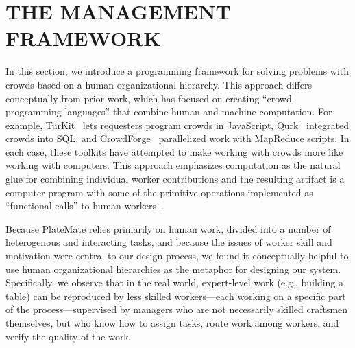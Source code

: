 \section{THE MANAGEMENT FRAMEWORK}
In this section, we introduce a programming framework for solving
problems with crowds based on a human organizational hierarchy. This
approach differs conceptually from prior work, which has focused on
creating ``crowd programming languages'' that combine human and
machine computation. For example, TurKit~\cite{little2010turkit} lets requesters
program crowds in JavaScript, Qurk~\cite{qurk} integrated crowds into
SQL, and CrowdForge~\cite{crowdforge} parallelized work with MapReduce
scripts. In each case, these toolkits have attempted to make working
with crowds more like working with computers.
This approach emphasizes computation as the natural glue for combining individual worker contributions and the resulting artifact is a computer program with some of the primitive operations implemented as ``functional calls'' to human workers~\cite{little2010turkit}.

Because PlateMate relies primarily on human work, divided into a number of heterogenous and interacting tasks, and because the issues of worker skill and motivation were central to our design process, we found it conceptually helpful to use human organizational hierarchies as the metaphor for designing our system.  Specifically, we observe that in the real world, expert-level work (e.g., building a table) can be reproduced by less skilled workers---each working on a specific part of the process---supervised by managers who are not necessarily skilled craftsmen themselves, but who know how to assign tasks, route work among workers, and verify the quality of the work.



